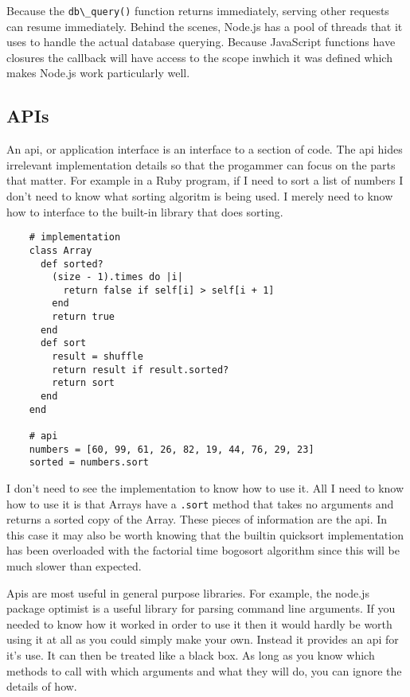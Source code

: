 \documentclass[11pt]{article}
\begin{document}
   
   Because the \verb|db\_query()| function returns immediately, serving
   other requests can resume immediately.  Behind the scenes, Node.js
   has a pool of threads that it uses to handle the actual database
   querying.  Because JavaScript functions have closures the callback
   will have access to the scope inwhich it was defined which makes
   Node.js work particularly well.
   
\subsection*{APIs}
\label{sec-1.6}

   An api, or application interface is an interface to a section of
   code.  The api hides irrelevant implementation details so that the
   progammer can focus on the parts that matter.  For example in a
   Ruby program, if I need to sort a list of numbers I don't need to
   know what sorting algoritm is being used.  I merely need to know
   how to interface to the built-in library that does sorting.
   
\begin{verbatim}
    # implementation
    class Array
      def sorted?
        (size - 1).times do |i|
          return false if self[i] > self[i + 1]
        end
        return true
      end
      def sort
        result = shuffle
        return result if result.sorted?
        return sort
      end
    end
    
    # api
    numbers = [60, 99, 61, 26, 82, 19, 44, 76, 29, 23]
    sorted = numbers.sort
\end{verbatim}

   
   I don't need to see the implementation to know how to use it.  All
   I need to know how to use it is that Arrays have a \verb|.sort|
   method that takes no arguments and returns a sorted copy of the
   Array.  These pieces of information are the api.  In this case it
   may also be worth knowing that the builtin quicksort implementation
   has been overloaded with the factorial time bogosort algorithm
   since this will be much slower than expected.
   
   Apis are most useful in general purpose libraries.  For example,
   the node.js package optimist is a useful library for parsing
   command line arguments.  If you needed to know how it worked in
   order to use it then it would hardly be worth using it at all as
   you could simply make your own.  Instead it provides an api for
   it's use.  It can then be treated like a black box.  As long as you
   know which methods to call with which arguments and what they will
   do, you can ignore the details of how.
   
\end{document}
